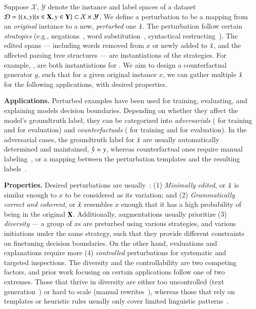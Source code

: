 Suppose $\mathcal{X}$, $\mathcal{Y}$ denote the instance and label spaces of a dataset $\mathcal{D} = \{ (x,y) | x \in \mathbf{X}, y \in \mathbf{Y} \}\subset \mathcal{X} \times \mathcal{Y}$. We define a perturbation to be a mapping from an \emph{original} instance to a new, \emph{perturbed} one $\hat{x}$.
The perturbation follow certain \emph{strategies} (e.g., negations~\cite{kaushik2019learning}, word substitution~\cite{li-etal-2020-bert-attack}, syntactical restructing~\cite{iyyer2018adversarial}).
The edited spans --- including words removed from $x$ or newly added to $\hat{x}$, and the affected parsing tree structures --- are instantiations of the strategies.
For example, ,  are both instantiations for .
We aim to design a counterfactual generator $g$, such that for a given original instance $x$, we can gather multiple $\hat{x}$ for the following applications, with desired properties.

\textbf{Applications.}
Perturbed examples have been used for training, evaluating, and explaining models decision boundaries.
Depending on whether they affect the model's groundtruth label, they can be categorized into \emph{adversarials} (\eg \citet{wu2019conditional} for training and \citet{jin2020bert} for evaluation) and \emph{counterfactuals} (\eg \citet{kaushik2019learning} for training and \citet{gardner2020contrast} for evaluation).
In the adversarial cases, the groundtruth label for $\hat{x}$ are usually automatically determined and maintained, \ie $\hat{y} = y$, whereas counterfactual ones require manual labeling~\cite{Khashabi2020MoreBF}, or a mapping between the perturbation templates and the resulting labels~\cite{li2020linguistically}.

\textbf{Properties.}
Desired perturbations are usually~\cite{morris2020textattack}:
(1) \emph{Minimally edited}, or $\hat{x}$ is similar enough to $x$ to be considered as its variation; and 
(2) \emph{Grammatically correct and coherent}, or $\hat{x}$ resembles $x$ enough that it has a high probability of being in the original $\mathbf{X}$.
Additionally, augmentations usually prioritize (3) \emph{diversity} --- a group of $x$s are preturbed using various strategies, and various initiations under the same strategy, such that they provide different constraints on finetuning decision boundaries.
On the other hand, evaluations and explanations require more (4) \emph{controlled} perturbations for systematic and targeted inspections.
The diversity and the controllability are two competing factors, and prior work focusing on certain applications follow one of two extremes.
Those that thrive in diversity are either too uncontrolled (\eg text generation~\cite{iyyer2018adversarial}) or hard to scale (\eg manual rewrites~\cite{kaushik2019learning, gardner2020contrast}), whereas those that rely on templates or heuristic rules usually only cover limited linguistic patterns~\cite{li2020linguistically}.



